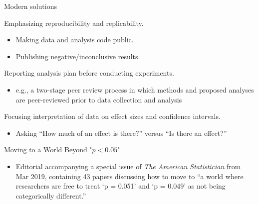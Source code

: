 \documentclass[
  ignorenonframetext,
  aspectratio=169]{beamer}
\providecommand{\tightlist}{%
  \setlength{\itemsep}{0pt}\setlength{\parskip}{0pt}}
\begin{document}
\begin{frame}{Modern solutions}
\protect\hypertarget{modern-solutions}{}
\small

Emphasizing reproducibility and replicability.

\begin{itemize}
\item
  Making data and analysis code public.
\item
  Publishing negative/inconclusive results.
\end{itemize}

Reporting analysis plan before conducting experiments.

\begin{itemize}
\tightlist
\item
  e.g., a two-stage peer review process in which methods and proposed
  analyses are peer-reviewed prior to data collection and analysis
\end{itemize}

Focusing interpretation of data on effect sizes and confidence
intervals.

\begin{itemize}
\tightlist
\item
  Asking ``How much of an effect is there?'' versus ``Is there an
  effect?''
\end{itemize}

\href{https://www.tandfonline.com/doi/full/10.1080/00031305.2019.1583913}{Moving to a World Beyond "$p < 0.05$"}

\begin{itemize}
\tightlist
\item
  Editorial accompanying a special issue of \emph{The American
  Statistician} from Mar 2019, containing 43 papers discussing how to
  move to ``a world where researchers are free to treat `p = 0.051' and
  `p = 0.049' as not being categorically different.''
\end{itemize}
\end{frame}
\end{document}

